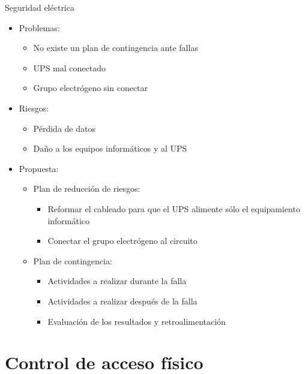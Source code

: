 \documentclass[spanish]{beamer}
\begin{document}
\begin{frame}{Seguridad eléctrica}
  \begin{itemize}
  \item Problemas:
    \begin{itemize}
    \item No existe un plan de contingencia ante fallas
    \item UPS mal conectado
    \item Grupo electrógeno sin conectar
    \end{itemize}
  \item Riesgos:
    \begin{itemize}
    \item Pérdida de datos
    \item Daño a los equipos informáticos y al UPS
    \end{itemize}
  \item Propuesta:
    \begin{itemize}
    \item Plan de reducción de riesgos:
      \begin{itemize}
      \item Reformar el cableado para que el UPS alimente sólo el equipamiento informático
      \item Conectar el grupo electrógeno al circuito
      \end{itemize}
    \item Plan de contingencia: %
      \begin{itemize}
      \item Actividades a realizar durante la falla
      \item Actividades a realizar después de la falla
      \item Evaluación de los resultados y retroalimentación %
      \end{itemize}
    \end{itemize}
  \end{itemize}
\end{frame}


\section{Control de acceso físico}
\end{document}
